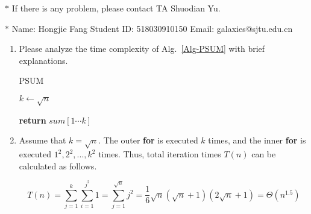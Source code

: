 \documentclass[12pt,a4paper]{article}
\makeatletter
\newtheorem*{solution}{Solution}
\theoremstyle{definition}
\renewenvironment{solution}[1][Solution] {\par\pushQED{\qed}\normalfont\topsep6\p@\@plus6\p@\relax\trivlist\item[\hskip\labelsep\bfseries#1\@addpunct{.}]\ignorespaces}{\popQED\endtrivlist\@endpefalse} \makeatother
\makeatother
\begin{document}
\noindent

\noindent{}
\begin{center}
\footnotesize{\color{red}$*$ If there is any problem, please contact TA Shuodian Yu.}

\footnotesize{\color{blue}$*$ Name: Hongjie Fang  \quad Student ID: 518030910150 \quad Email: galaxies@sjtu.edu.cn}
\end{center}

\begin{enumerate}
    \item
    Please analyze the time complexity of Alg.~\ref{Alg-PSUM} with brief explanations.

    \begin{minipage}[t]{0.8\textwidth}
    \begin{algorithm}[H]
        \caption{PSUM}\label{Alg-PSUM}

        \BlankLine

        $k \leftarrow \sqrt{n}$\;


        {\bf return} $sum[1\cdots k]$\;
    \end{algorithm}
    \end{minipage}

    \begin{solution}
        Assume that $k = \sqrt{n}$. The outer \textbf{for} is executed $k$ times, and the inner \textbf{for} is executed $1^2, 2^2, ..., k^2$ times. Thus, total iteration times $T(n)$ can be calculated as follows.

        \begin{displaymath}
            T(n) = \sum_{j = 1}^k \sum_{i=1}^{j^2} 1 = \sum_{j=1}^{\sqrt{n}} j^2 = \frac{1}{6}\sqrt{n}(\sqrt{n} + 1)(2\sqrt{n} + 1) = \Theta(n ^ {1.5})
        \end{displaymath}


\end{solution}
\end{enumerate}
\end{document}
